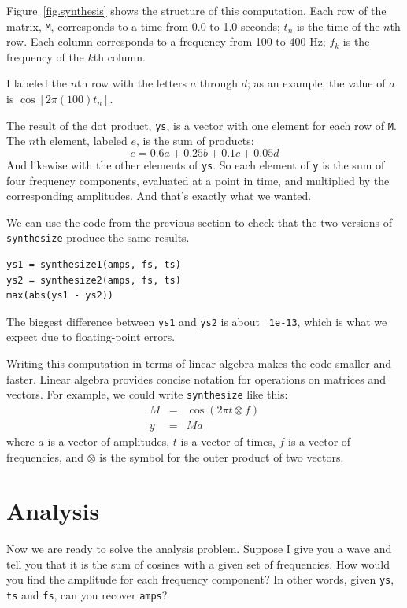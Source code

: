 \documentclass[12pt]{book}
\begin{document}
Figure~\ref{fig.synthesis} shows the structure of this computation.
Each row of the matrix, {\tt M}, corresponds to a time
from 0.0 to 1.0 seconds; $t_n$ is the time of the $n$th row.
Each column corresponds to a frequency from
100 to 400 Hz; $f_k$ is the frequency of the $k$th column.

I labeled the $n$th row with the letters $a$ through $d$; as an
example, the value of $a$ is $\cos [2 \pi (100) t_n]$.

The result of the dot product, {\tt ys}, is a vector with one element
for each row of {\tt M}.  The $n$th element, labeled $e$, is the sum
of products:
%
\[ e = 0.6 a + 0.25 b + 0.1 c + 0.05 d \]
%
And likewise with the other elements of {\tt ys}.  So each element
of {\tt y} is the sum of four frequency components, evaluated at
a point in time, and multiplied by the corresponding amplitudes.
And that's exactly what we wanted.

We can use the code from the previous section to check that the two
versions of {\tt synthesize} produce the same results.

\begin{verbatim}
ys1 = synthesize1(amps, fs, ts)
ys2 = synthesize2(amps, fs, ts)
max(abs(ys1 - ys2))
\end{verbatim}

The biggest difference between {\tt ys1} and {\tt ys2} is about {\tt
  1e-13}, which is what we expect due to floating-point errors.

Writing this computation in terms of linear algebra makes the code
smaller and faster.  Linear algebra
provides concise notation for operations on matrices and vectors.  For
example, we could write {\tt synthesize} like this:
%
\begin{eqnarray*}
M &=& \cos (2 \pi t \otimes f) \\
y &=& M a
\end{eqnarray*}
%
where $a$ is a vector of amplitudes,
$t$ is a vector of times, $f$ is a vector of frequencies, and
$\otimes$ is the symbol for the outer product of two vectors.


\section{Analysis}
\label{analysis}

Now we are ready to solve the analysis problem.  Suppose I give you
a wave and tell you that it is the sum of cosines with a given set
of frequencies.  How would you find the amplitude for each frequency
component?  In other words, given {\tt ys}, {\tt ts} and {\tt fs},
can you recover {\tt amps}?
\end{document}
